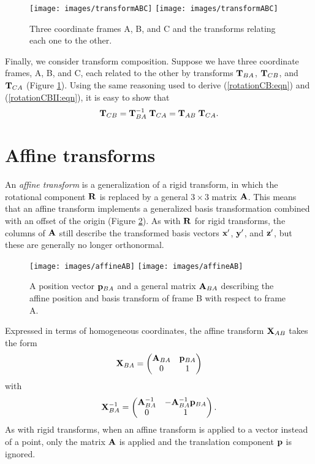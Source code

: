 \begin{figure}[t]
\begin{center}
 \iflatexml
   \texttt{[image: images/transformABC]}
 \else
   \texttt{[image: images/transformABC]}
 \fi
\end{center}
\caption{Three coordinate frames A, B, and C and the transforms
relating each one to the other.}
\label{transformsABC:fig}
\end{figure}

Finally, we consider transform composition. Suppose we have three
coordinate frames, A, B, and C, each related to the other by
transforms ${\bf T}_{BA}$, ${\bf T}_{CB}$, and ${\bf T}_{CA}$ (Figure
\ref{transformsABC:fig}).  Using the same reasoning used to derive
(\ref{rotationCB:eqn}) and (\ref{rotationCBII:eqn}), it is easy to
show that
%
\begin{equation}
{\bf T}_{CB} = {\bf T}_{BA}^{-1} \; {\bf T}_{CA} = {\bf T}_{AB} \; {\bf T}_{CA}.
\end{equation}
%

\section{Affine transforms}
\label{AffineTransforms:sec}

An {\it affine transform} is a generalization of a rigid transform, in
which the rotational component ${\bf R}$ is replaced by a general $3 \times
3$ matrix ${\bf A}$. This means that an affine transform implements a
generalized basis transformation combined with an offset of the origin
(Figure \ref{affineAB:fig}). As with ${\bf R}$ for rigid transforms, the
columns of ${\bf A}$ still describe the transformed basis vectors ${\bf x}'$,
${\bf y}'$, and ${\bf z}'$, but these are generally no longer orthonormal.

\begin{figure}[ht]
\begin{center}
 \iflatexml
    \texttt{[image: images/affineAB]}
 \else
    \texttt{[image: images/affineAB]}
 \fi
\end{center}
\caption{A position vector ${\bf p}_{BA}$ and a general matrix ${\bf A}_{BA}$
describing the affine position and basis transform of frame B with respect to
frame A.}
\label{affineAB:fig}
\end{figure}

Expressed in terms of homogeneous coordinates,
the affine transform ${\bf X}_{AB}$ takes the form
%
\begin{equation}
{\bf X}_{BA} = \left(\begin{matrix} {\bf A}_{BA} & {\bf p}_{BA} \\ 0 & 1 \end{matrix}\right)
\end{equation}
%
with
%
\begin{equation}
{\bf X}_{BA}^{-1} = \left(\begin{matrix} {\bf A}_{BA}^{-1} & -{\bf A}_{BA}^{-1} {\bf p}_{BA} \\ 0 & 1 \end{matrix}\right).
\end{equation}
%
As with rigid transforms, when an affine transform is applied to a
vector instead of a point, only the matrix ${\bf A}$ is applied and the
translation component ${\bf p}$ is ignored.

